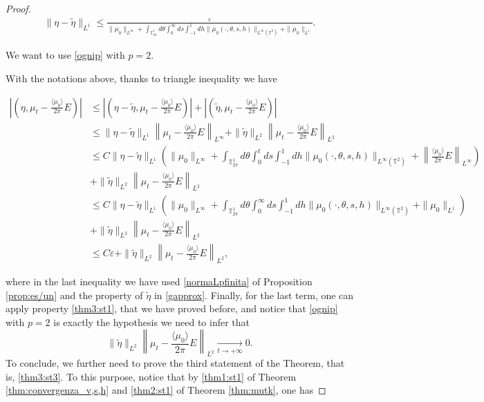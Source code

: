 \documentclass[a4paper,10pt,reqno]{amsart}
\numberwithin{equation}{subsection}
\numberwithin{figure}{subsection}
\begin{document}
\begin{proof}
\begin{align}\label{gapprox}
\|\eta-\tilde\eta\|_{L^1}\leq\frac{\varepsilon}{\|\mu_0\|_{L^{\infty}}+\int_{\mathbb{T}^1_{2\pi}}d\theta\int_0^{\infty}ds\int_{-1}^1dh\|\mu_0(\cdot,\theta,s,h)\|_{L^{\infty}(\mathbb{T}^2)}+\|\mu_0\|_{L^1}}.
\end{align}

We want to use \eqref{ognip} with $p=2$. 

With the notations above, thanks to triangle inequality we have

{\tiny\begin{align*}
\left|\left( \eta,\mu_t-\frac{\langle\mu_0\rangle}{2\pi}E\right)\right|&\leq\left|\left(\eta-\tilde\eta,\mu_t-\frac{\langle\mu_0\rangle}{2\pi}E\right)\right|+\left|\left(\tilde\eta,\mu_t-\frac{\langle\mu_0\rangle}{2\pi}E\right)\right|
\\
&\leq\|\eta-\tilde\eta\|_{L^1}\left\|\mu_t-\frac{\langle\mu_0\rangle}{2\pi}E\right\|_{L^{\infty}}+\|\tilde\eta\|_{L^2}\left\|\mu_t-\frac{\langle\mu_0\rangle}{2\pi}E\right\|_{L^2}
\\
&\leq C\|\eta-\tilde\eta\|_{L^1}\left(\|\mu_0\|_{L^{\infty}}+\int_{\mathbb{T}^1_{2\pi}}d\theta\int_0^tds\int_{-1}^1dh\|\mu_0(\cdot,\theta,s,h)\|_{L^{\infty}(\mathbb{T}^2)}+\left\|\frac{\langle\mu_0\rangle}{2\pi}E\right\|_{L^{\infty}}\right)
\\
&+\|\tilde\eta\|_{L^2}\left\|\mu_t-\frac{\langle\mu_0\rangle}{2\pi}E\right\|_{L^2}
\\
&\leq C\|\eta-\tilde\eta\|_{L^1}\left(\|\mu_0\|_{L^{\infty}}+\int_{\mathbb{T}^1_{2\pi}}d\theta\int_0^{\infty}ds\int_{-1}^1dh\|\mu_0(\cdot,\theta,s,h)\|_{L^{\infty}(\mathbb{T}^2)}+\|\mu_0\|_{L^1}\right)
\\
&+\|\tilde\eta\|_{L^2}\left\|\mu_t-\frac{\langle\mu_0\rangle}{2\pi}E\right\|_{L^2}
\\
&\leq C\varepsilon+\|\tilde\eta\|_{L^2}\left\|\mu_t-\frac{\langle\mu_0\rangle}{2\pi}E\right\|_{L^2},
\end{align*}}

where in the last inequality we have used \eqref{normaLpfinita} of Proposition \ref{prop:es/un} and the property of $\tilde\eta$ in \eqref{gapprox}. Finally, for the last term, one can apply property \eqref{thm3:st1}, that we have proved before, and notice that \eqref{ognip} with $p=2$ is exactly the hypothesis we need to infer that
\[
\|\tilde\eta\|_{L^2}\left\|\mu_t-\frac{\langle\mu_0\rangle}{2\pi}E\right\|_{L^2}\xrightarrow[t\to+\infty]{}0.
\]
To conclude, we further need to prove the third statement of the Theorem, that is, \eqref{thm3:st3}. To this purpose, notice that by \eqref{thm1:st1} of Theorem \ref{thm:convergenza_v,s,h} and \eqref{thm2:st1} of Theorem \ref{thm:mutk}, one has


\end{proof}
\end{document}
